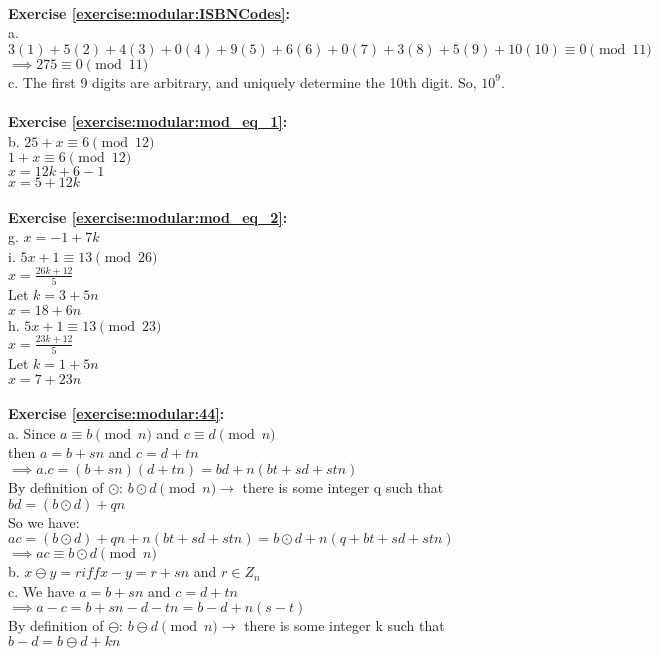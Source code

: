 \\
\textbf{Exercise \ref{exercise:modular:ISBNCodes}:}\\
a. $3(1)+5(2)+4(3)+0(4)+9(5)+6(6)+0(7)+3(8)+5(9)+10(10) \equiv 0 \pmod{11}$\\
$\implies 275 \equiv 0 \pmod{11}$\\
c. The first 9 digits are arbitrary, and uniquely determine the 10th digit. So, $10^9$.\\
\\
\textbf{Exercise \ref{exercise:modular:mod_eq_1}:}\\
b. $25+x \equiv 6 \pmod{12}$\\
$1+x \equiv 6 \pmod{12}$\\
$x= 12k+6-1$\\
$x=5+12k$\\
\\
\textbf{Exercise \ref{exercise:modular:mod_eq_2}:}\\
g. $x=-1+7k$\\
i. $5x+1 \equiv 13 \pmod{26}$\\
$x= \displaystyle\frac{26k+12}{5}$\\
Let $k=3+5n$\\
$x=18+6n$\\
h. $5x+1 \equiv 13 \pmod{23}$\\
$x= \displaystyle\frac{23k+12}{5}$\\
Let $k=1+5n$\\
$x=7+23n$\\
\\
\textbf{Exercise \ref{exercise:modular:44}:}\\
a. Since $a \equiv b \pmod{n}$ and $c \equiv d \pmod{n}$\\
then $a=b+sn$ and $c=d+tn$\\
$\implies a.c =(b+sn)(d+tn)=bd+n(bt+sd+stn)$\\
By definition of $\odot$: $b \odot d \pmod{n} \to$ there is some integer q such that $bd=(b \odot d) +qn$\\
So we have: $ac=(b \odot d)+qn+n(bt+sd+stn)=b \odot d + n(q+bt+sd+stn)$\\
$\implies ac \equiv b \odot d \pmod{n}$\\
b. $x \ominus y=r iff x-y=r+sn$ and $r \in Z_n$\\
c. We have $a=b+sn$ and $c=d+tn$\\
$\implies a-c=b+sn-d-tn=b-d+n(s-t)$\\
By definition of $\ominus$: $b \ominus d \pmod{n} \to$ there is some integer k such that $b-d=b \ominus d +kn$\\
